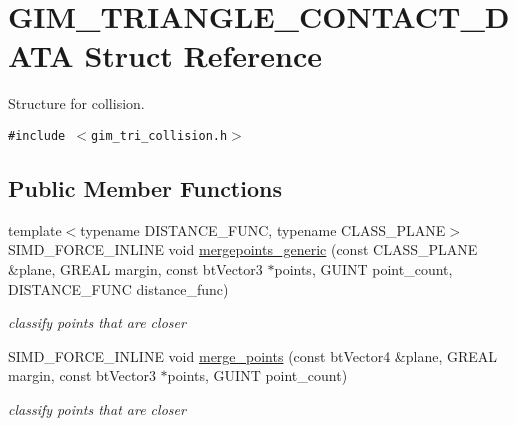 \hypertarget{struct_g_i_m___t_r_i_a_n_g_l_e___c_o_n_t_a_c_t___d_a_t_a}{
\section{GIM\_\-TRIANGLE\_\-CONTACT\_\-DATA Struct Reference}
\label{struct_g_i_m___t_r_i_a_n_g_l_e___c_o_n_t_a_c_t___d_a_t_a}
}
Structure for collision.  


{\tt \#include $<$gim\_\-tri\_\-collision.h$>$}

\subsection*{Public Member Functions}
\begin{CompactItemize}
\item 
\hypertarget{struct_g_i_m___t_r_i_a_n_g_l_e___c_o_n_t_a_c_t___d_a_t_a_ae4327eaac6bfc1b899a19d039508f3b}{
{\footnotesize template$<$typename DISTANCE\_\-FUNC, typename CLASS\_\-PLANE$>$ }\\SIMD\_\-FORCE\_\-INLINE void \hyperlink{struct_g_i_m___t_r_i_a_n_g_l_e___c_o_n_t_a_c_t___d_a_t_a_ae4327eaac6bfc1b899a19d039508f3b}{mergepoints\_\-generic} (const CLASS\_\-PLANE \&plane, GREAL margin, const btVector3 $\ast$points, GUINT point\_\-count, DISTANCE\_\-FUNC distance\_\-func)}
\label{struct_g_i_m___t_r_i_a_n_g_l_e___c_o_n_t_a_c_t___d_a_t_a_ae4327eaac6bfc1b899a19d039508f3b}

\begin{CompactList}\small\item\em classify points that are closer \item\end{CompactList}\item 
\hypertarget{struct_g_i_m___t_r_i_a_n_g_l_e___c_o_n_t_a_c_t___d_a_t_a_4d3e25d735f8e5111bb54dd764cbb041}{
SIMD\_\-FORCE\_\-INLINE void \hyperlink{struct_g_i_m___t_r_i_a_n_g_l_e___c_o_n_t_a_c_t___d_a_t_a_4d3e25d735f8e5111bb54dd764cbb041}{merge\_\-points} (const btVector4 \&plane, GREAL margin, const btVector3 $\ast$points, GUINT point\_\-count)}
\label{struct_g_i_m___t_r_i_a_n_g_l_e___c_o_n_t_a_c_t___d_a_t_a_4d3e25d735f8e5111bb54dd764cbb041}

\begin{CompactList}\small\item\em classify points that are closer \item\end{CompactList}\end{CompactItemize}


